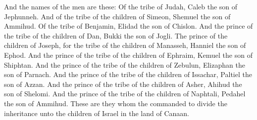 \begin{biblechapter}
\verse And the names of the men are these: Of the tribe of Judah, Caleb the son of Jephunneh.
\verse And of the tribe of the children of Simeon, Shemuel the son of Ammihud.
\verse Of the tribe of Benjamin, Elidad the son of Chislon.
\verse And the prince of the tribe of the children of Dan, Bukki the son of Jogli.
\verse The prince of the children of Joseph, for the tribe of the children of Manasseh, Hanniel the son of Ephod.
\verse And the prince of the tribe of the children of Ephraim, Kemuel the son of Shiphtan.
\verse And the prince of the tribe of the children of Zebulun, Elizaphan the son of Parnach.
\verse And the prince of the tribe of the children of Issachar, Paltiel the son of Azzan.
\verse And the prince of the tribe of the children of Asher, Ahihud the son of Shelomi.
\verse And the prince of the tribe of the children of Naphtali, Pedahel the son of Ammihud.
\verse These are they whom the \LORD commanded to divide the inheritance unto the children of Israel in the land of Canaan.
\end{biblechapter}

